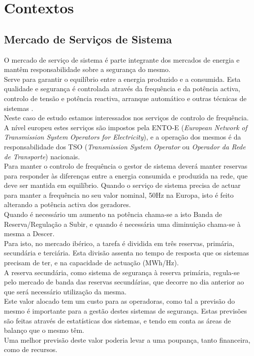 \chapter{Contextos\label{ch:contextos}}

\section{Mercado de Serviços de Sistema \label{se:servicos_sistema}}

O mercado de serviço de sistema é parte integrante dos mercados de energia e mantêm responsabilidade sobre a segurança do mesmo.\cite{dgegmss} \\
Serve para garantir o equilíbrio entre a energia produzido e a consumida. Esta qualidade e segurança é controlada através da frequência e da potência activa, controlo de tensão e potência reactiva, arranque automático e outras técnicas de sistemas \cite{Rassid2017} \cite{Carneiro2016}. \\
Neste caso de estudo estamos interessados nos serviços de controlo de frequência. A nível europeu estes serviços são impostos pela ENTO-E (\textit{European Network of Transmission System Operators for Electricity}), e a operação dos mesmos é da responsabilidade dos TSO (\textit{Transmission System Operator} ou \textit{ Operador da Rede de Transporte}) nacionais.\\
Para manter o controlo de frequência o gestor de sistema deverá manter reservas para responder às diferenças entre a energia consumida e produzida na rede, que deve ser mantida em equilíbrio. Quando o serviço de sistema precisa de actuar para manter a frequência no seu valor nominal, 50Hz na Europa, isto é feito alterando a potência activa dos geradores.  \\
Quando é necessário um aumento na potência chama-se a isto Banda de Reserva/Regulação a Subir, e quando é necessária uma diminuição chama-se à mesma a Descer. \\
Para isto, no mercado ibérico, a tarefa é dividida em três reservas, primária, secundária e terciária. Esta divisão assenta no tempo de resposta que os sistemas precisam de ter, e na capacidade de actuação (MWh/Hz). \\

A reserva secundária, como sistema de segurança à reserva primária, regula-se pelo mercado de banda das reservas secundárias, que decorre no dia anterior ao que será necessário utilização da mesma. \\
Este valor alocado tem um custo para as operadoras, como tal a previsão do mesmo é importante para a gestão destes sistemas de segurança. Estas previsões são feitas através de estatísticas dos sistemas, e tendo em conta as áreas de balanço que o mesmo têm. \\
Uma melhor previsão deste valor poderia levar a uma poupança, tanto financeira, como de recursos. \\

